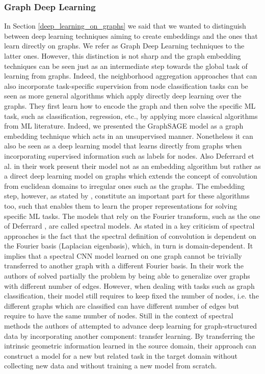 \subsubsection{Graph Deep Learning}
In Section \ref{deep_learning_on_graphs} we said that we wanted to distinguish between deep learning techniques aiming to create embeddings and the ones that learn directly on graphs. We refer as Graph Deep Learning techniques to the latter ones. However, this distinction is not sharp and the graph embedding techniques can be seen just as an intermediate step towards the global task of learning from graphs. Indeed,  the neighborhood aggregation approaches that can also incorporate task-specific supervision from node classification tasks can be seen as more general algorithms which apply directly deep learning over the graphs. They first learn how to encode the graph and then solve the specific ML task, such as classification, regression, etc., by applying more classical algorithms from ML literature. Indeed, we presented the GraphSAGE \cite{graphSAGE} model as a graph embedding technique which acts in an unsupervised manner. Nonetheless it can also be seen as a deep learning model that learns directly from graphs when incorporating supervised information such as labels for nodes. Also Deferrard et al. in their work \cite{deferrard} present their model not as an embedding algorithm but rather as a direct deep learning model on graphs which extends the concept of convolution from euclidean domains to irregular ones such as the graphs. The embedding step, however, as stated by \cite{representationLearning}, constitute an important part for these algorithms too, such that enables them to learn the proper representations for solving specific ML tasks. The models that rely on the Fourier transform, such as the one of Deferrard \cite{deferrard}, are called spectral models. As stated in \cite{monet} a key criticism of spectral approaches is the fact that the spectral definition of convolution is dependent on the Fourier basis (Laplacian eigenbasis), which, in turn is domain-dependent. It implies that a spectral CNN model learned on one graph cannot be trivially transferred to another graph with a different Fourier basis. In their work the authors of \cite{monet} solved partially the problem by being able to generalize over graphs with different number of edges. However, when dealing with tasks such as graph classification, their model still requires to keep fixed the number of nodes, i.e. the different graphs which are classified can have different number of edges but require to have the same number of nodes. Still in the context of spectral methods the authors of \cite{transfer_learning_on_graphs} attempted to advance deep learning for graph-structured data by incorporating another component: transfer learning. By transferring the intrinsic geometric information learned in the source domain, their approach can construct a model for a new but related task in the target domain without collecting new data and without training a new model from scratch.

